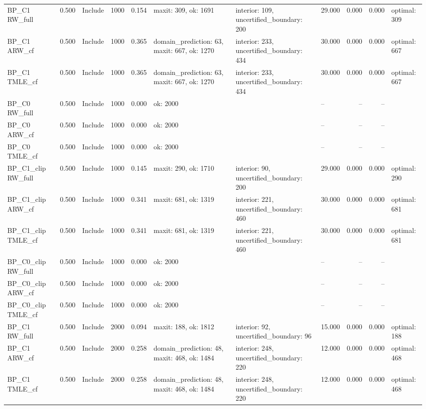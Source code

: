 \begin{tabular}{llllrlllrrl}
BP\_C1 RW\_full & 0.500 & Include & 1000 & 0.154 & maxit: 309, ok: 1691 & interior: 109, uncertified\_boundary: 200 & 29.000 & 0.000 & 0.000 & optimal: 309 \\
BP\_C1 ARW\_cf & 0.500 & Include & 1000 & 0.365 & domain\_prediction: 63, maxit: 667, ok: 1270 & interior: 233, uncertified\_boundary: 434 & 30.000 & 0.000 & 0.000 & optimal: 667 \\
BP\_C1 TMLE\_cf & 0.500 & Include & 1000 & 0.365 & domain\_prediction: 63, maxit: 667, ok: 1270 & interior: 233, uncertified\_boundary: 434 & 30.000 & 0.000 & 0.000 & optimal: 667 \\
BP\_C0 RW\_full & 0.500 & Include & 1000 & 0.000 & ok: 2000 &  & -- & -- & -- &  \\
BP\_C0 ARW\_cf & 0.500 & Include & 1000 & 0.000 & ok: 2000 &  & -- & -- & -- &  \\
BP\_C0 TMLE\_cf & 0.500 & Include & 1000 & 0.000 & ok: 2000 &  & -- & -- & -- &  \\
BP\_C1\_clip RW\_full & 0.500 & Include & 1000 & 0.145 & maxit: 290, ok: 1710 & interior: 90, uncertified\_boundary: 200 & 29.000 & 0.000 & 0.000 & optimal: 290 \\
BP\_C1\_clip ARW\_cf & 0.500 & Include & 1000 & 0.341 & maxit: 681, ok: 1319 & interior: 221, uncertified\_boundary: 460 & 30.000 & 0.000 & 0.000 & optimal: 681 \\
BP\_C1\_clip TMLE\_cf & 0.500 & Include & 1000 & 0.341 & maxit: 681, ok: 1319 & interior: 221, uncertified\_boundary: 460 & 30.000 & 0.000 & 0.000 & optimal: 681 \\
BP\_C0\_clip RW\_full & 0.500 & Include & 1000 & 0.000 & ok: 2000 &  & -- & -- & -- &  \\
BP\_C0\_clip ARW\_cf & 0.500 & Include & 1000 & 0.000 & ok: 2000 &  & -- & -- & -- &  \\
BP\_C0\_clip TMLE\_cf & 0.500 & Include & 1000 & 0.000 & ok: 2000 &  & -- & -- & -- &  \\
BP\_C1 RW\_full & 0.500 & Include & 2000 & 0.094 & maxit: 188, ok: 1812 & interior: 92, uncertified\_boundary: 96 & 15.000 & 0.000 & 0.000 & optimal: 188 \\
BP\_C1 ARW\_cf & 0.500 & Include & 2000 & 0.258 & domain\_prediction: 48, maxit: 468, ok: 1484 & interior: 248, uncertified\_boundary: 220 & 12.000 & 0.000 & 0.000 & optimal: 468 \\
BP\_C1 TMLE\_cf & 0.500 & Include & 2000 & 0.258 & domain\_prediction: 48, maxit: 468, ok: 1484 & interior: 248, uncertified\_boundary: 220 & 12.000 & 0.000 & 0.000 & optimal: 468 \\

\end{tabular}
